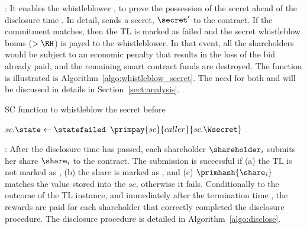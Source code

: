 \smallskip
\texttt{\algowhistleblowsecret}:
It enables the whistleblower \whistleblower, to prove the possession of the secret ahead of the disclosure time \td.
In detail, \whistleblower sends a secret, $\secret'$ to the contract.
If the commitment matches, then the TL is marked as failed and the secret whistleblow bonus \Wsecret ($>\RH$) is payed to the whistleblower.
In that event, all the shareholders would be subject to an economic penalty that results in the loss of the bid already paid, and the remaining smart contract funds are destroyed.
The function is illustrated is Algorithm~\ref{algo:whistleblow_secret}.
The need for both \texttt{\algowhistleblowshare} and \texttt{\algowhistleblowsecret} will be discussed in details in Section~\ref{sect:analysis}.

\begin{algorithm}[t]
	\caption{SC function to whistleblow the secret before \td}\label{algo:whistleblow_secret}
	\begin{algorithmic}[1]
		\vspace{0.6em}
		\State $sc.\state\gets \statefailed$
		\State $\primpay{sc}{caller}{sc.\Wsecret}$
		\EndIf
		\EndIf
		\EndProcedure
	\end{algorithmic}
\end{algorithm}


\smallskip
\texttt{\algodisclose}:
After the disclosure time \td has passed, each shareholder $\shareholder_{i}$ submits her share $\share_{i}$ to the contract.
The submission is successful if (a) the TL is not marked as \statefailed, (b) the share is marked as \statepaid, and (c) $\primhash{\share_i}$ matches the value stored into the $sc$, otherwise it fails.
Conditionally to the outcome of the TL instance, and immediately after the termination time \te, the rewards are paid for each shareholder that correctly completed the disclosure procedure.
The disclosure procedure is detailed in Algorithm~\ref{algo:disclose}.